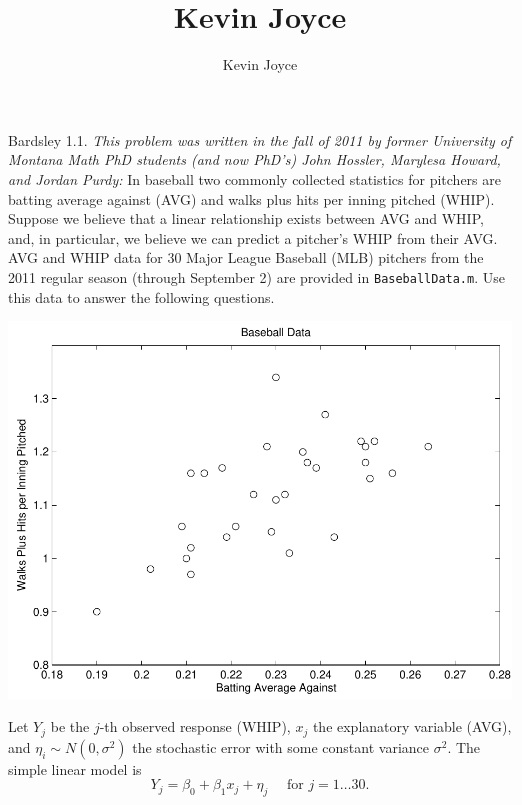 \documentclass{homework}
\title{Kevin Joyce}
\author{Kevin Joyce}
\begin{document}
 
\newcommand{\figref}[1]{\figurename~\ref{#1}}
\renewcommand{\bar}{\overline}
\renewcommand{\hat}{\widehat}
\renewcommand{\SS}{\mathcal S}
\newcommand{\HH}{\mathscr H}
\newcommand{\mom}{\widetilde}
\newcommand{\mle}{\widehat \Uptheta}
\newcommand{\eps}{\varepsilon}
\newcommand{\todist}{\stackrel{D}\longrightarrow}
\newcommand{\toprob}{\stackrel{p}\longrightarrow}
\newcommand{\TTheta}{\overline{\underline \Theta} }
\newcommand{\del}{\partial}
\newcommand{\approxsim}{\overset{\cdotp}{\underset{\cdotp}{\sim}}}
\begin{longproblem}
Bardsley 1.1. \emph{This problem was written in the fall of 2011 by
former University of Montana Math PhD students (and now PhD's) John
Hossler, Marylesa Howard, and Jordan Purdy:}  In baseball two
commonly collected statistics for pitchers are batting average
against (AVG) and walks plus hits per inning pitched (WHIP).
Suppose we believe that a linear relationship exists between AVG and
WHIP, and, in particular, we believe we can predict a pitcher's WHIP
from their AVG.  AVG and WHIP data for 30 Major League Baseball
(MLB) pitchers from the 2011 regular season (through September 2)
are provided in \texttt{BaseballData.m}.  Use this data to answer
the following questions.

\begin{center}
\includegraphics[width=.4\textwidth]{scatter1.pdf}
\end{center}


\begin{solution}
Let $Y_j$ be the $j$-th observed response (WHIP), $x_j$ the explanatory variable (AVG), and $\eta_i \sim N(0,\sigma^2)$ the stochastic error with some constant variance $\sigma^2$. The simple linear model is 
$$
  Y_j = \beta_0 + \beta_1 x_j + \eta_j\quad\text{ for }j=1\dots30.
$$


\end{solution}
\end{longproblem}
\end{document}
